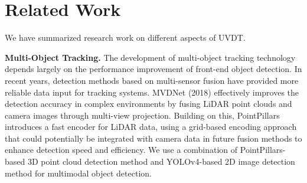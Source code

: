 \documentclass[journal,twoside,web]{ieeecolor}
\begin{document}
\section{Related Work}

We have summarized research work on different aspects of UVDT.

\textbf{Multi-Object Tracking.}
The development of multi-object tracking technology depends largely on the performance improvement of front-end object detection.
In recent years, detection methods based on multi-sensor fusion have provided more reliable data input for tracking systems.
MVDNet (2018) effectively improves the detection accuracy in complex environments by fusing LiDAR point clouds and camera images through multi-view projection\cite{Alpher22h}.
Building on this, PointPillars introduces a fast encoder for LiDAR data, using a grid-based encoding approach that could potentially be integrated with camera data in future fusion methods to enhance detection speed and efficiency\cite{Alpher19}.
We use a combination of PointPillars-based 3D point cloud detection method and YOLOv4-based 2D image detection method for multimodal object detection.
\end{document}
